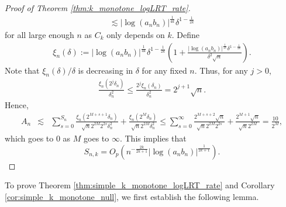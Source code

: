 \documentclass[12pt,letterpaper, twoside, openany]{article}
\theoremstyle{plain}
\begin{document}
\begin{proof}[Proof of Theorem \ref{thm:k_monotone_logLRT_rate}]
\begin{align}
	\lesssim 
	|\log (a_n b_n)|^{\frac{1}{4k}}\delta^{1-\frac{1}{2k}}
	\label{eq:JFH}
\end{align}
for all large enough $n$ as $C_k$ only depends on $k$. Define 
\begin{align*}
	\xi_{n}(\delta) := 
	|\log (a_n b_n)|^{\frac{1}{4k}} \delta^{1-\frac{1}{2k}} 
	\left(
	1+\frac{|\log (a_n b_n)|^{\frac{1}{4k}}\delta^{1-\frac{1}{2k}}
	}{\delta^2\sqrt{n}}
	\right). 
\end{align*}
Note that $\xi_{n}(\delta)/\delta$ is decreasing in $\delta$ for any fixed $n$. Thus, for any $j>0$, 
\begin{align*}
	\frac{\xi_{n}(2^j \delta_n)}{\delta^{2}_n} \leq \frac{2^j \xi_{n}(\delta_n)}{\delta^{2}_n} = 2^{j+1} \sqrt{n}.
\end{align*}
Hence,
\begin{eqnarray*}
	A_n & \lesssim & \sum^{S_n}_{s=0} \frac{ \xi_n(2^{M+s+1} \delta_n)}{ \sqrt{n}2^{2M}2^{2s} \delta^2_n} + \frac{\xi_n(2^M \delta_n)}{\sqrt{n} 2^{2M} \delta^2_n} 
	\leq  \sum^\infty_{s=0} \frac{2^{M+s+2} \sqrt{n}}{\sqrt{n}2^{2M}2^{2s}} + \frac{2^{M+1} \sqrt{n}}{\sqrt{n} 2^{2M}} = \frac{10}{2^M},
\end{eqnarray*}
which goes to $0$ as $M$ goes to $\infty$. This implies that
\begin{equation*}
    	S_{n,k} 
				= O_p\left(n^{-\frac{2k}{2k+1}} |\log (a_n b_n) |^{\frac{1}{2k+1}} \right).
\end{equation*}
%	
\end{proof}

To prove Theorem \ref{thm:simple_k_monotone_logLRT_rate} and Corollary \ref{cor:simple_k_monotone_null}, we first establish the following lemma.
\end{document}
